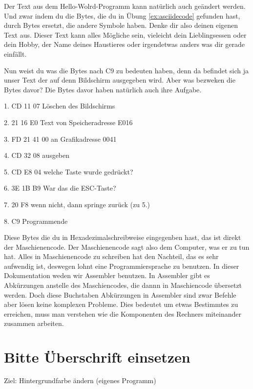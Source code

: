 \documentclass[10pt]{book}
\begin{document}
\begin{Exercise}[label=ex:asciiencode]
Der Text aus dem Hello-Wolrd-Programm
kann natürlich auch ge\-än\-dert werden.
Und zwar indem du die Bytes,
die du in Übung \ref{ex:asciidecode} gefunden hast,
durch Bytes ersetzt, die andere Symbole haben.
Denke dir also deinen eigenen Text aus.
Dieser Text kann alles Mögliche sein,
vieleicht dein Lieblingsessen oder dein Hobby,
der Name deines Haustieres
oder irgendetwas anders was dir gerade einfällt.
\end{Exercise}

Nun weist du was die Bytes nach C9 zu bedeuten haben,
denn da befindet sich ja unser Text der auf denn Bildschirm ausgegeben wird.
Aber was bezweken die Bytes davor? Die Bytes davor haben natürlich auch ihre Aufgabe.

1. CD 11 07		Löschen des Bildschirms

2. 21 16 E0		Text von Speicheradresse E016

3. FD 21 41 00		an Grafikadresse 0041

4. CD 32 08		ausgeben

5. CD E8 04		welche Taste wurde gedrückt?

6. 3E 1B B9		War das die ESC-Taste?

7. 20 F8		wenn nicht, dann springe zurück (zu 5.)

8. C9			Programmende


Diese Bytes die du in Hexadezimalschreibweise
eingegenben hast, das ist direkt der Maschienencode.
Der Maschienencode sagt also dem Computer,
was er zu tun hat. Alles in Maschienencode zu schreiben
hat den Nachteil, das es sehr aufwendig ist,
deswegen lohnt eine Programmiersprache zu benutzen.
In dieser Dokumentation weden wir Assembler benutzen.
In Assembler gibt es Abkürzungen
anstelle des Maschiencodes,
die dannn in Maschiencode übersetzt werden.
Doch diese Buchstaben Abkürzungen in Assembler
sind zwar Befehle aber lösen keine komplexen Probleme.
Dies bedeutet um etwas Bestimmtes zu erreichen,
muss man verstehen wie die Komponenten
des Rechners miteinander zusammen arbeiten.

\section{Bitte Überschrift einsetzen}

Ziel: Hintergrundfarbe ändern (eigenes Programm)
\end{document}
